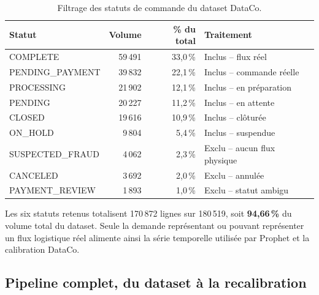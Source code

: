 \documentclass[11pt,a4paper]{article}
\begin{document}
\begin{table}[htbp]
\centering
\caption{Filtrage des statuts de commande du dataset DataCo.}
\label{tab:dataco-statuts}
\begin{tabularx}{\textwidth}{lrrX}
\toprule
Statut & Volume & \% du total & Traitement \\
\midrule
COMPLETE & 59\,491 & 33,0\,\% & Inclus -- flux réel \\
PENDING\_PAYMENT & 39\,832 & 22,1\,\% & Inclus -- commande réelle \\
PROCESSING & 21\,902 & 12,1\,\% & Inclus -- en préparation \\
PENDING & 20\,227 & 11,2\,\% & Inclus -- en attente \\
CLOSED & 19\,616 & 10,9\,\% & Inclus -- clôturée \\
ON\_HOLD & 9\,804 & 5,4\,\% & Inclus -- suspendue \\
\midrule
SUSPECTED\_FRAUD & 4\,062 & 2,3\,\% & Exclu -- aucun flux physique \\
CANCELED & 3\,692 & 2,0\,\% & Exclu -- annulée \\
PAYMENT\_REVIEW & 1\,893 & 1,0\,\% & Exclu -- statut ambigu \\
\bottomrule
\end{tabularx}
\end{table}

Les six statuts retenus totalisent 170\,872 lignes sur 180\,519, soit \textbf{94,66\,\%} du volume total du dataset. Seule la demande représentant ou pouvant représenter un flux logistique réel alimente ainsi la série temporelle utilisée par Prophet et la calibration DataCo.

\subsection{Pipeline complet, du dataset à la recalibration}
\end{document}
